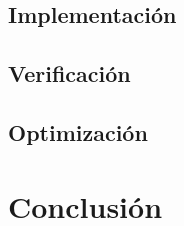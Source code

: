 \documentclass[a4,11pt]{article}
\begin{document}
\subsection{Implementación}
\label{sec:implementacion}

\subsection{Verificación}
\label{sec:verificacion}

\subsection{Optimización}
\label{sec:optimizacion}


\section{Conclusión}
\label{sec:conclusion}

\nocite{*}


\listoffigures
\end{document}

